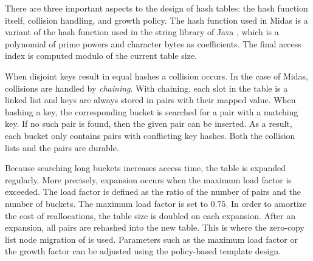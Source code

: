 There are three important aspects to the design of hash tables: the hash
function itself, collision handling, and growth policy. The hash function used
in Midas is a variant of the hash function used in the string library of Java
\cite{javadoc2018hashcode}, which is a polynomial of prime powers and character
bytes as coefficients. The final access index is computed modulo of the current
table size.

When disjoint keys result in equal hashes a collision occurs. In the case of
Midas, collisions are handled by \emph{chaining}. With chaining, each slot in
the table is a linked list and keys are always stored in pairs with their mapped
value. When hashing a key, the corresponding bucket is searched for a pair with
a matching key. If no such pair is found, then the given pair can be inserted.
As a result, each bucket only contains pairs with conflicting key hashes. Both
the collision lists and the pairs are durable.

Because searching long buckets increases access time, the table is expanded
regularly. More precisely, expansion occurs when the maximum load factor is
exceeded. The load factor is defined as the ratio of the number of pairs and the
number of buckets. The maximum load factor is set to $0.75$. In order to
amortize the cost of reallocations, the table size is doubled on each expansion.
After an expansion, all pairs are rehashed into the new table. This is where the
zero-copy list node migration of  is used. Parameters such as the
maximum load factor or the growth factor can be adjusted using the policy-based
template design.




